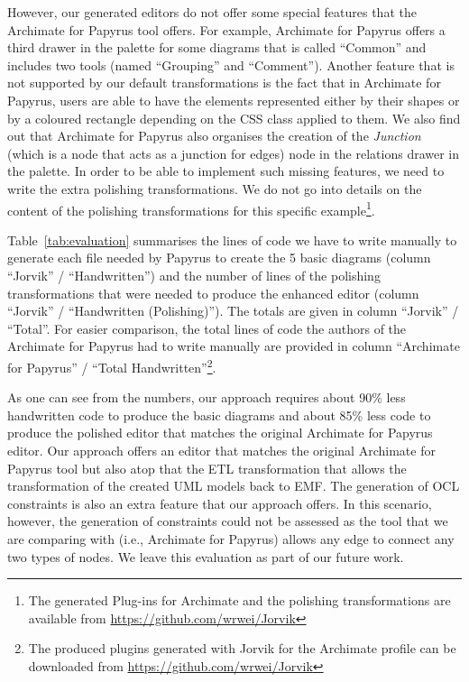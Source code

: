 However, our generated editors do not offer some special features that the Archimate for Papyrus tool offers. 
For example, Archimate for Papyrus offers a third drawer in the palette for some diagrams that is called ``Common'' and includes two tools (named ``Grouping'' and ``Comment''). 
Another feature that is not supported by our default transformations is the fact that in Archimate for Papyrus, users are able to have the elements represented either by their shapes or by a coloured rectangle depending on the CSS class applied to them. 
We also find out that Archimate for Papyrus also organises the creation of the \textit{Junction} (which is a node that acts as a junction for edges) node in the relations drawer in the palette. 
In order to be able to implement such missing features, we need to write the extra polishing transformations. 
We do not go into details on the content of the polishing transformations for this specific example\footnote{The generated Plug-ins for Archimate and the polishing transformations are available from \url{https://github.com/wrwei/Jorvik}}.

Table~\ref{tab:evaluation} summarises the lines of code we have to write manually to generate each file needed by Papyrus to create the 5 basic diagrams (column ``Jorvik'' / ``Handwritten'') and the number of lines of the polishing transformations that were needed to produce the enhanced editor (column ``Jorvik'' / ``Handwritten (Polishing)''). 
The totals are given in column ``Jorvik'' / ``Total''. 
For easier comparison, the total lines of code the authors of the Archimate for Papyrus had to write manually are provided in column ``Archimate for Papyrus'' / ``Total Handwritten''\footnote{The produced plugins generated with Jorvik for the Archimate profile can be downloaded from \url{https://github.com/wrwei/Jorvik}}.

As one can see from the numbers, our approach requires about 90\% less handwritten code to produce the basic diagrams and about 85\% less code to 
produce the polished editor that matches the original Archimate for Papyrus editor. 
Our approach offers an editor that matches the original Archimate for Papyrus tool but also atop that the ETL transformation that allows the transformation of the created UML models back to EMF. 
The generation of OCL constraints is also an extra feature that our approach offers. 
In this scenario, however, the generation of constraints could not be assessed as the tool that we are comparing with (i.e., Archimate for Papyrus) allows any edge to connect any two types of nodes. We leave this evaluation as part of our future work.

